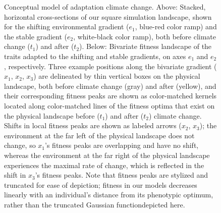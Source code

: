 \documentclass[9pt,twocolumn,twoside,lineno]{pnas-new}
\begin{document}
\begin{figure}
    \caption{Conceptual model of adaptation climate change. Above: Stacked, horizontal cross-sections of our square simulation landscape, shown for the shifting environmental gradient ($e_{1}$, blue-red color ramp) and the stable gradient ($e_{2}$, white-black color ramp), both before climate change ($t_{1}$) and after ($t_{2}$). Below: Bivariate fitness landscape of the traits adapted to the shifting and stable gradients, on axes $e_{1}$ and $e_{2}$, respectively. Three example positions along the bivariate gradient ($x_{1}$, $x_{2}$, $x_{3}$) are delineated by thin vertical boxes on the physical landscape, both before climate change (gray) and after (yellow), and their corresponding fitness peaks are shown as color-matched kernels located along color-matched lines of the fitness optima that exist on the physical landscape before ($t_{1}$) and after ($t_{2}$) climate change. Shifts in local fitness peaks are shown as labeled arrows ($x_{2}$, $x_{3}$); the environment at the far left of the physical landscape does not change, so $x_{1}$'s fitness peaks are overlapping and have no shift, whereas the environment at the far right of the physical landscape experiences the maximal rate of change, which is reflected in the shift in $x_{3}$'s fitness peaks. Note that fitness peaks are stylized and truncated for ease of depiction; fitness in our models decreases linearly with an individual's distance from its phenotypic optimum, rather than the truncated Gaussian functiondepicted here.}
\label{fig:conceptual}
\end{figure}
\end{document}
